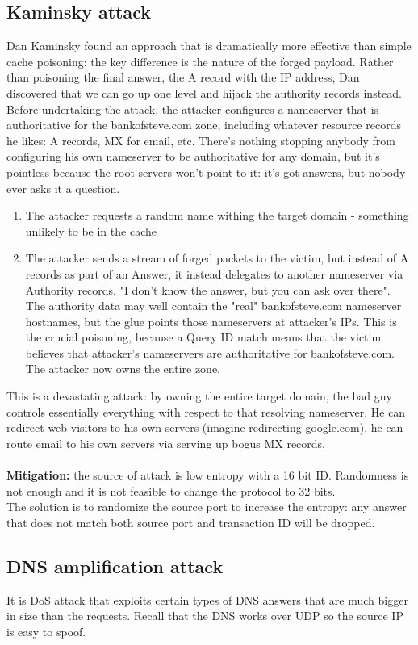 \documentclass[10pt,a4paper]{book}
\begin{document}
\subsection{Kaminsky attack}
Dan Kaminsky found an approach that is dramatically more effective than simple cache poisoning: the key difference is the nature of the forged payload.
Rather than poisoning the final answer, the A record with the IP address, Dan discovered that we can go up one level and hijack the authority records instead.
Before undertaking the attack, the attacker configures a nameserver that is authoritative for the bankofsteve.com zone, including whatever resource records he likes: A records, MX for email, etc.
There's nothing stopping anybody from configuring his own nameserver to be authoritative for any domain, but it's pointless because the root servers won't point to it: it's got answers, but nobody ever asks it a question. 
\begin{enumerate}
\item The attacker requests a random name withing the target domain - something unlikely to be in the cache
\item The attacker sends a stream of forged packets to the victim, but instead of A records as part of an Answer, it instead delegates to another nameserver via Authority records. "I don't know the answer, but you can ask over there".  The authority data may well contain the "real" bankofsteve.com nameserver hostnames, but the glue points those nameservers at attacker's IPs. This is the crucial poisoning, because a Query ID match means that the victim believes that attacker's nameservers are authoritative for bankofsteve.com.
The attacker now owns the entire zone. 
\end{enumerate}
This is a devastating attack: by owning the entire target domain, the bad guy controls essentially everything with respect to that resolving nameserver. He can redirect web visitors to his own servers (imagine redirecting google.com), he can route email to his own servers via serving up bogus MX records. \\\\
\textbf{Mitigation:} the source of attack is low entropy with a 16 bit ID. Randomness is not enough and it is not feasible to change the protocol to 32 bits. \\
The solution is to randomize the source port to increase the entropy: any answer that does not match both source port and transaction ID will be dropped.
\subsection{DNS amplification attack}
It is DoS attack that exploits certain types of DNS answers that are much bigger in size than the requests. Recall that the DNS works over UDP so the source IP is easy to spoof.
\end{document}
